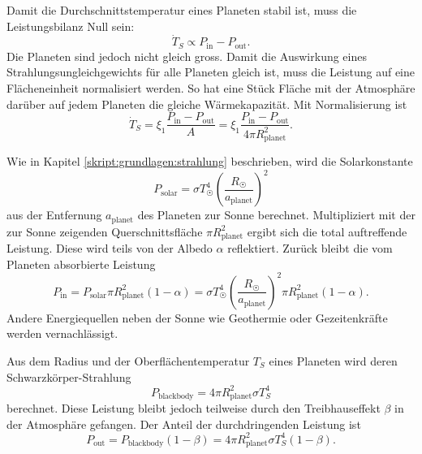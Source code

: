 \begin{refsection}
Damit die Durchschnittstemperatur eines Planeten stabil ist, muss die Leistungsbilanz Null sein:
\begin{equation}
\dot{T}_S \propto P_{\text{in}} - P_{\text{out}}\text{.}
\end{equation}
Die Planeten sind jedoch nicht gleich gross. Damit die Auswirkung eines Strahlungsungleichgewichts für alle Planeten gleich ist, muss die Leistung auf eine Flächeneinheit normalisiert werden. So hat eine Stück Fläche mit der Atmosphäre darüber auf jedem Planeten die gleiche Wärmekapazität. Mit Normalisierung ist
\begin{equation}
\dot{T}_S = \xi_1 \frac{P_{\text{in}} - P_{\text{out}}}{A} = \xi_1 \frac{P_{\text{in}} - P_{\text{out}}}{4 \pi R_{\text{planet}}^2}\text{.}
\end{equation}

Wie in Kapitel \ref{skript:grundlagen:strahlung} beschrieben, wird die Solarkonstante
\begin{equation}
P_{\text{solar}} = \sigma T_{\astrosun}^4 \left( \frac{R_{\astrosun}}{a_{\text{planet}}} \right) ^2
\end{equation}
aus der Entfernung $a_{\text{planet}}$ des Planeten zur Sonne berechnet. Multipliziert mit der zur Sonne zeigenden Querschnittsfläche $\pi R_{\text{planet}}^2$ ergibt sich die total auftreffende Leistung. Diese wird teils von der Albedo $\alpha$ reflektiert. Zurück bleibt die vom Planeten absorbierte Leistung \begin{equation}
P_{\text{in}} = P_{\text{solar}}  \pi R_{\text{planet}}^2 (1-\alpha) = \sigma T_{\astrosun}^4 \left( \frac{R_{\astrosun}}{a_{\text{planet}}} \right) ^2 \pi R_{\text{planet}}^2 (1-\alpha)\text{.}
\end{equation}
Andere Energiequellen neben der Sonne wie Geothermie oder Gezeitenkräfte werden vernachlässigt.

Aus dem Radius und der Oberflächentemperatur $T_{S}$ eines Planeten wird deren Schwarzkörper-Strahlung
%
\begin{equation}
P_{\text{blackbody}} = 4 \pi R_{\text{planet}}^2 \sigma T_{S}^4
\end{equation}
berechnet. Diese Leistung bleibt jedoch teilweise durch den Treibhauseffekt $\beta$ in der Atmosphäre gefangen. Der Anteil der durchdringenden Leistung ist
\begin{equation}
P_{\text{out}} = P_{\text{blackbody}} (1 - \beta) = 4 \pi R_{\text{planet}}^2 \sigma T_{S}^4 (1 - \beta)\text{.}
\end{equation}


\end{refsection}
